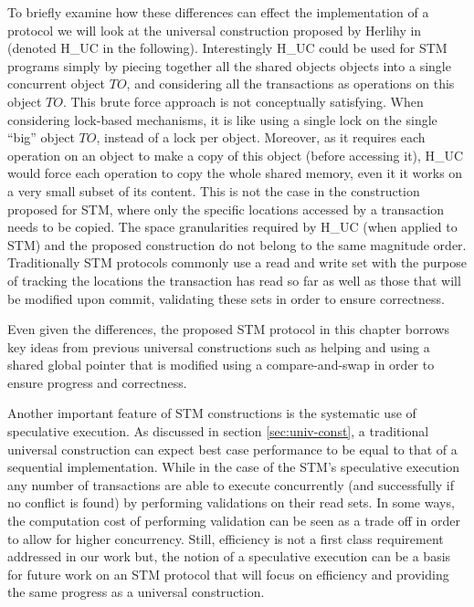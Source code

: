 To briefly examine how these differences can effect the implementation
of a protocol we will look at the universal construction proposed
by Herlihy in \cite{H91} (denoted H\_UC in the following).
Interestingly H\_UC could be used for STM programs simply  by
piecing together  all the shared objects objects into a single concurrent object 
$\mathit{TO}$,  and  considering   all  the   transactions   as  operations
on this   object 
$\mathit{TO}$.  This  brute force approach is not conceptually satisfying.  
When considering lock-based mechanisms,   it is like using a single lock 
on  the single  ``big'' object $\mathit{TO}$, instead of a lock per object. 
Moreover, as it  requires each operation on an object to make a copy of 
this object   (before  accessing it),  H\_UC would force each  operation to
copy the whole  shared memory, even it  it works on a very  small subset of
its  content.  This is not the case in the construction proposed
for STM, where
only  the specific locations accessed by a transaction needs to be copied. 
The space granularities required by  H\_UC (when applied to STM)  and 
the proposed construction do not belong to the same magnitude order.
Traditionally STM protocols commonly use a read and write set
with the purpose of tracking the  locations the transaction  has read so far as well as those
that will be modified upon commit, validating these sets
in order to ensure correctness.

Even given the differences,
the proposed STM protocol in this chapter borrows key ideas from previous
universal constructions such as helping and using a shared global pointer
that is modified using a compare-and-swap in order to ensure
progress and correctness.

Another important feature of  STM constructions
is the  systematic use of  speculative execution.
As discussed in section \ref{sec:univ-const}, a traditional universal construction can expect best
case performance to be equal to that of a sequential implementation.
While in the case of the STM's speculative execution
any number of transactions are able to execute concurrently (and successfully if no
conflict is  found) by performing  validations on their read  sets.
In some ways, the computation cost of performing validation can be seen as
a trade off in order to allow for higher concurrency.
Still,  efficiency is   not a  first class  requirement addressed  in our
work but, the notion of a  speculative  execution  can  be  a  basis  for  future
work  on  an STM protocol   that will focus on efficiency and  providing the same progress as a universal construction.

